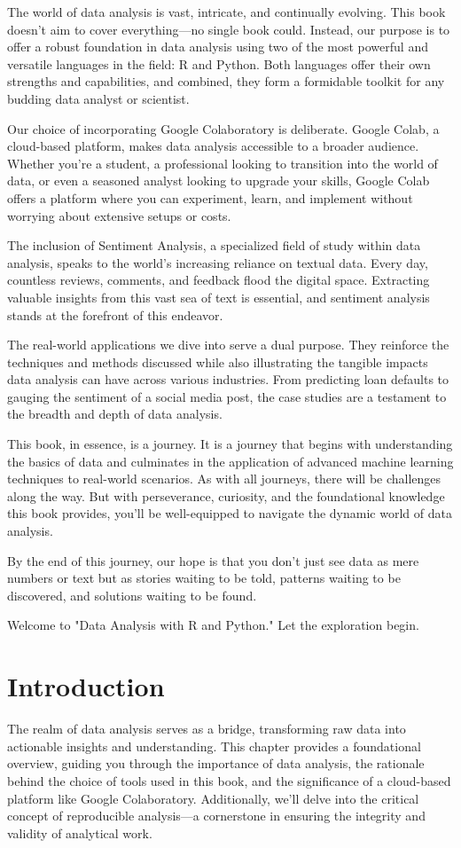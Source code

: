 \documentclass[a4paper,12pt]{book}
\begin{document}
The world of data analysis is vast, intricate, and continually evolving. This book doesn't aim to cover everything—no single book could. Instead, our purpose is to offer a robust foundation in data analysis using two of the most powerful and versatile languages in the field: R and Python. Both languages offer their own strengths and capabilities, and combined, they form a formidable toolkit for any budding data analyst or scientist.

Our choice of incorporating Google Colaboratory is deliberate. Google Colab, a cloud-based platform, makes data analysis accessible to a broader audience. Whether you're a student, a professional looking to transition into the world of data, or even a seasoned analyst looking to upgrade your skills, Google Colab offers a platform where you can experiment, learn, and implement without worrying about extensive setups or costs.

The inclusion of Sentiment Analysis, a specialized field of study within data analysis, speaks to the world's increasing reliance on textual data. Every day, countless reviews, comments, and feedback flood the digital space. Extracting valuable insights from this vast sea of text is essential, and sentiment analysis stands at the forefront of this endeavor.

The real-world applications we dive into serve a dual purpose. They reinforce the techniques and methods discussed while also illustrating the tangible impacts data analysis can have across various industries. From predicting loan defaults to gauging the sentiment of a social media post, the case studies are a testament to the breadth and depth of data analysis.

This book, in essence, is a journey. It is a journey that begins with understanding the basics of data and culminates in the application of advanced machine learning techniques to real-world scenarios. As with all journeys, there will be challenges along the way. But with perseverance, curiosity, and the foundational knowledge this book provides, you'll be well-equipped to navigate the dynamic world of data analysis.

By the end of this journey, our hope is that you don't just see data as mere numbers or text but as stories waiting to be told, patterns waiting to be discovered, and solutions waiting to be found.

Welcome to "Data Analysis with R and Python." Let the exploration begin.

\chapter{Introduction}
The realm of data analysis serves as a bridge, transforming raw data into actionable insights and understanding. This chapter provides a foundational overview, guiding you through the importance of data analysis, the rationale behind the choice of tools used in this book, and the significance of a cloud-based platform like Google Colaboratory. Additionally, we'll delve into the critical concept of reproducible analysis—a cornerstone in ensuring the integrity and validity of analytical work.
\end{document}
